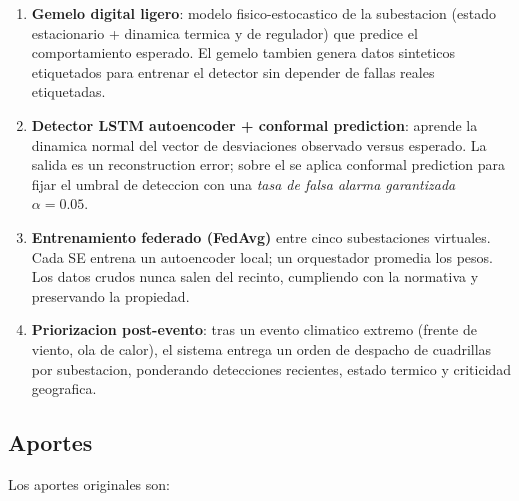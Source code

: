 \begin{enumerate}[leftmargin=*,itemsep=2pt]
  \item \textbf{Gemelo digital ligero}: modelo fisico-estocastico de la
        subestacion (estado estacionario + dinamica termica y de
        regulador) que predice el comportamiento esperado. El gemelo
        tambien genera datos sinteticos etiquetados para entrenar el
        detector sin depender de fallas reales etiquetadas.

  \item \textbf{Detector LSTM autoencoder + conformal prediction}:
        aprende la dinamica normal del vector de desviaciones observado
        versus esperado. La salida es un reconstruction error; sobre el
        se aplica conformal prediction para fijar el umbral de
        deteccion con una \emph{tasa de falsa alarma garantizada}
        $\alpha = 0.05$.

  \item \textbf{Entrenamiento federado (FedAvg)} entre cinco
        subestaciones virtuales. Cada SE entrena un autoencoder local;
        un orquestador promedia los pesos. Los datos crudos nunca
        salen del recinto, cumpliendo con la normativa y preservando
        la propiedad.

  \item \textbf{Priorizacion post-evento}: tras un evento climatico
        extremo (frente de viento, ola de calor), el sistema entrega un
        orden de despacho de cuadrillas por subestacion, ponderando
        detecciones recientes, estado termico y criticidad geografica.
\end{enumerate}

\subsection{Aportes}

Los aportes originales son:

